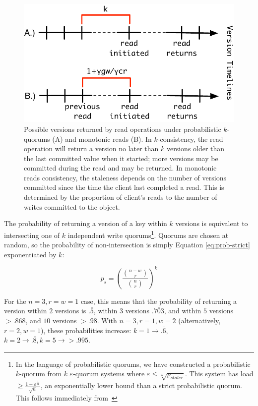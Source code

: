 \documentclass{vldb}
\begin{document}
\begin{figure}
\centering
\includegraphics[width=\columnwidth]{figs/timelines.pdf}
\caption{Possible versions returned by read operations under
  probabilistic $k$-quorums (A) and monotonic reads (B). In
  $k$-consistency, the read operation will return a version no later
  than $k$ versions older than the last committed value when it
  started; more versions may be committed during the read and may be
  returned.  In monotonic reads consistency, the staleness depends on
  the number of versions committed since the time the client last
  completed a read.  This is determined by the proportion of client's
  reads to the number of writes committed to the object.}
\label{fig:timelines}
\end{figure}

The probability of returning a version of a key within $k$ versions is
equivalent to intersecting one of $k$ independent write
quorums\footnote{In the language of probabilistic quorums, we have
  constructed a probabilistic $k$-quorum from $k$ $\varepsilon$-quorum
  systems where $\varepsilon \leq \sqrt[k]{p_{staler}}$. This system
  has load $\geq \frac{1-\varepsilon^{\frac{1}{2k}}}{\sqrt{n}}$, an
  exponentially lower bound than a strict probabilistic quorum.  This
  follows immediately from~\cite[Corollary 3.12]{prob-quorum}}.
Quorums are chosen at random, so the probability of non-intersection
is simply Equation \ref{eq:prob-strict} exponentiated by $k$:

\begin{equation}
\label{eq:k-consistency}
p_s = \left(\frac{{n-w \choose r}}{{n \choose r}}\right)^k
\end{equation}

For the $n=3, r=w=1$ case, this means that the probability of
returning a version within $2$ versions is $.\overline{5}$, within $3$
versions $.\overline{703}$, and within $5$ versions $> .868$, and $10$
versions $>.98$.  With $n=3, r=1, w=2$ (alternatively, $r=2, w=1$),
these probabilities increase: $k=1 \rightarrow
.\overline{6}$, $k=2 \rightarrow .\overline{8}, k=5 \rightarrow >
.995$.
\end{document}
